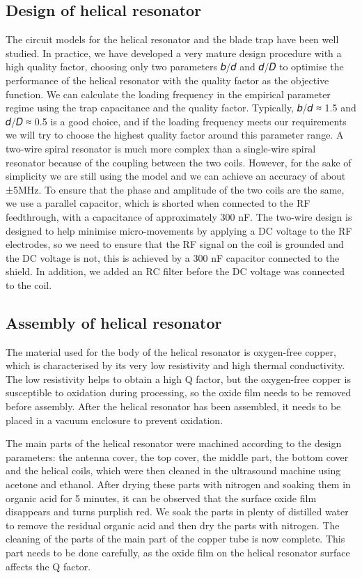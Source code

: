 \subsection{Design of helical resonator}

The circuit models for the helical resonator and the blade trap have been well studied. In practice, we have developed a very mature design procedure with a high quality factor, choosing only two parameters 𝑏/𝑑 and 𝑑/𝐷 to optimise the performance of the helical resonator with the quality factor as the objective function. We can calculate the loading frequency in the empirical parameter regime using the trap capacitance and the quality factor. Typically, 𝑏/𝑑 ≈ 1.5 and 𝑑/𝐷 ≈ 0.5 is a good choice, and if the loading frequency meets our requirements we will try to choose the highest quality factor around this parameter range. A two-wire spiral resonator is much more complex than a single-wire spiral resonator because of the coupling between the two coils. However, for the sake of simplicity we are still using the model and we can achieve an accuracy of about ±5MHz. To ensure that the phase and amplitude of the two coils are the same, we use a parallel capacitor, which is shorted when connected to the RF feedthrough, with a capacitance of approximately 300 nF. The two-wire design is designed to help minimise micro-movements by applying a DC voltage to the RF electrodes, so we need to ensure that the RF signal on the coil is grounded and the DC voltage is not, this is achieved by a 300 nF capacitor connected to the shield. In addition, we added an RC filter before the DC voltage was connected to the coil.

\subsection{Assembly of helical resonator}

The material used for the body of the helical resonator is oxygen-free copper, which is characterised by its very low resistivity and high thermal conductivity. The low resistivity helps to obtain a high Q factor, but the oxygen-free copper is susceptible to oxidation during processing, so the oxide film needs to be removed before assembly. After the helical resonator has been assembled, it needs to be placed in a vacuum enclosure to prevent oxidation.

The main parts of the helical resonator were machined according to the design parameters: the antenna cover, the top cover, the middle part, the bottom cover and the helical coils, which were then cleaned in the ultrasound machine using acetone and ethanol. After drying these parts with nitrogen and soaking them in organic acid for 5 minutes, it can be observed that the surface oxide film disappears and turns purplish red. We soak the parts in plenty of distilled water to remove the residual organic acid and then dry the parts with nitrogen. The cleaning of the parts of the main part of the copper tube is now complete. This part needs to be done carefully, as the oxide film on the helical resonator surface affects the Q factor.

